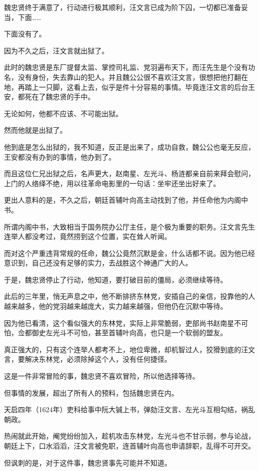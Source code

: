 \begin{multicols}{\theparacolNo}
		魏忠贤终于满意了，行动进行极其顺利，汪文言已成为阶下囚，一切都已准备妥当，下面……

		下面没有了。

		因为不久之后，汪文言就出狱了。

		此时的魏忠贤是东厂提督太监、掌控司礼监、党羽遍布天下，而汪先生是个没有功名，没有身份，失去靠山的犯人。并且魏公公很不喜欢汪文言，很想把他打翻在地，再踏上一只脚，这看上去，似乎是件十分容易的事情。毕竟连汪文言的后台王安，都死在了魏忠贤的手中。

		无论如何，他都不应该、不可能出狱。

		然而他就是出狱了。

		他到底是怎么出狱的，我不知道，反正是出来了，成功自救，魏公公也毫无反应，王安都没有办到的事情，他办到了。

		而且这位仁兄出狱之后，名声更大，赵南星、左光斗、杨涟都亲自前来拜会慰问，上门的人络绎不绝，用以往革命电影里的一句话：坐牢还坐出好来了。

		更出人意料的是，不久之后，朝廷首辅叶向高主动找到了他，并任命他为内阁中书。

		所谓内阁中书，大致相当于国务院办公厅主任，是个极为重要的职务。汪文言先生连举人都没考过，竟然捞到这个位置，实在耸人听闻。

		而对这个严重违背常规的任命，魏公公竟然沉默是金，什么话都不说。因为他已经意识到，自己还没有足够的实力，去战胜这个神通广大的人。

		于是，魏忠贤停止了行动，他知道，要打破目前的僵局，必须继续等待。

		此后的三年里，悄无声息之中，他不断排挤东林党，安插自己的亲信，投靠他的人越来越多，他的党羽越来越庞大，实力越来越强，但他仍在沉默中等待。

		因为他已看清，这个看似强大的东林党，实际上非常脆弱，吏部尚书赵南星不可怕，佥都御史左光斗不可怕，甚至首辅叶向高，也只是一个软弱的盟友。

		真正强大的，只有这个连举人都考不上，地位卑微，却机智过人，狡猾到底的汪文言，要解决东林党，必须除掉这个人，没有任何捷径。

		这是一件非常冒险的事，魏忠贤不喜欢冒险，所以他选择等待。

		但事情的发展，超出了所有人的预料，包括魏忠贤在内。

		天启四年（1624年）吏科给事中阮大铖上书，弹劾汪文言、左光斗互相勾结，祸乱朝政。

		热闹就此开始，阉党纷纷加入，趁机攻击东林党，左光斗也不甘示弱，参与论战，朝廷上下，口水滔滔，汪文言被免职，连首辅叶向高也申请辞职，乱得不可开交。

		但讽刺的是，对于这件事，魏忠贤事先可能并不知道。


\end{multicols}
